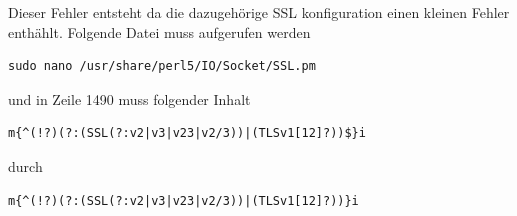 \documentclass[11pt,a4paper]{article} %
\begin{document}
Dieser Fehler entsteht da die dazugehörige SSL konfiguration einen kleinen Fehler enthählt.
Folgende Datei muss aufgerufen werden
\begin{frame}

\begin{lstlisting}
sudo nano /usr/share/perl5/IO/Socket/SSL.pm

\end{lstlisting}
\end{frame}

und in Zeile 1490 muss folgender Inhalt
\begin{frame}

\begin{lstlisting}
m{^(!?)(?:(SSL(?:v2|v3|v23|v2/3))|(TLSv1[12]?))$}i

\end{lstlisting}
\end{frame}

durch
\begin{frame}

\begin{lstlisting}
m{^(!?)(?:(SSL(?:v2|v3|v23|v2/3))|(TLSv1[12]?))}i

\end{lstlisting}
\end{frame}
\end{document}
